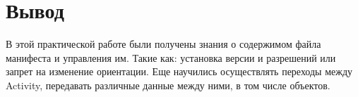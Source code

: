 \begin{lstlisting}[language=Java
	, caption=\leftline{}
	, label=lst:java:frg:orient
	]

\end{lstlisting}

\clearpage

\section*{\LARGE{Вывод}}
В этой практической работе были получены знания о содержимом файла
манифеста и управления им. Такие как: установка версии и разрешений или
запрет на изменение ориентации. Еще научились осуществлять переходы
между Activity, передавать различные данные между ними, в том числе
объектов.

